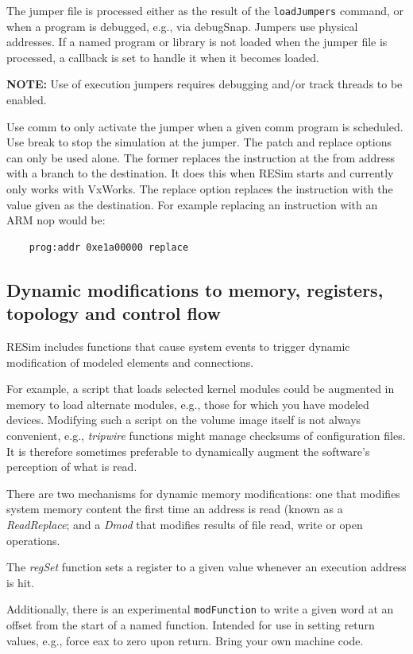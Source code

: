 \documentclass[titlepage]{article}
\begin{document}
The jumper file is processed either as the result of the {\tt loadJumpers} command, or when a program
is debugged, e.g., via debugSnap.  Jumpers use physical addresses.  If a named program or library is not loaded 
when the jumper file is processed, a callback is set to handle it when it becomes loaded.  

\textbf{NOTE:} Use of execution jumpers requires debugging and/or track threads to be enabled.

Use comm to only activate the jumper when a given comm program is scheduled.  Use break to stop the
simulation at the jumper.  The patch and replace options can only be used alone.  The former
replaces the instruction at the from address with a branch to the destination.  It does this when
RESim starts and currently only works with VxWorks.  The replace option replaces the instruction
with the value given as the destination.  For example replacing an instruction with an ARM nop would be:
   
\begin{verbatim}
    prog:addr 0xe1a00000 replace
\end{verbatim}

\subsection{Dynamic modifications to memory, registers, topology and control flow}
\label{dmod}
RESim includes functions that cause system events to trigger dynamic modification of modeled elements and connections.

For example, a script that loads selected kernel modules could be augmented in memory to
load alternate modules, e.g., those for which you have modeled devices.  Modifying such a script on the volume
image itself is not always convenient, e.g., \textit{tripwire} functions might manage checksums of
configuration files.  It is therefore sometimes preferable to dynamically augment the software's perception of what is read.

There are two mechanisms for dynamic memory modifications: one that modifies system memory content the first time an address is
read (known as a \textit{ReadReplace}; and a \textit{Dmod} that modifies results of file read, write or open operations.

The \textit{regSet} function sets a register to a given value whenever an execution address is hit.

Additionally, there is an experimental {\tt modFunction} to write a given word at an offset from the start of a named function.  
Intended for use in setting return values, e.g., force eax to zero upon return.  Bring your own machine code.  
\end{document}
